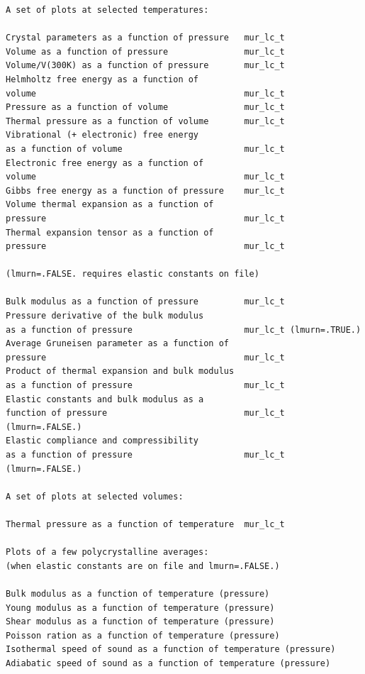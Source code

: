 \documentclass[12pt,a4paper,twoside]{report}
\begin{document}
\begin{footnotesize}
\begin{verbatim}
A set of plots at selected temperatures:

Crystal parameters as a function of pressure   mur_lc_t
Volume as a function of pressure               mur_lc_t
Volume/V(300K) as a function of pressure       mur_lc_t
Helmholtz free energy as a function of         
volume                                         mur_lc_t
Pressure as a function of volume               mur_lc_t
Thermal pressure as a function of volume       mur_lc_t
Vibrational (+ electronic) free energy         
as a function of volume                        mur_lc_t
Electronic free energy as a function of        
volume                                         mur_lc_t
Gibbs free energy as a function of pressure    mur_lc_t
Volume thermal expansion as a function of 
pressure                                       mur_lc_t
Thermal expansion tensor as a function of 
pressure                                       mur_lc_t

(lmurn=.FALSE. requires elastic constants on file)

Bulk modulus as a function of pressure         mur_lc_t
Pressure derivative of the bulk modulus        
as a function of pressure                      mur_lc_t (lmurn=.TRUE.)
Average Gruneisen parameter as a function of   
pressure                                       mur_lc_t
Product of thermal expansion and bulk modulus
as a function of pressure                      mur_lc_t
Elastic constants and bulk modulus as a 
function of pressure                           mur_lc_t (lmurn=.FALSE.)
Elastic compliance and compressibility
as a function of pressure                      mur_lc_t (lmurn=.FALSE.)

A set of plots at selected volumes:

Thermal pressure as a function of temperature  mur_lc_t

Plots of a few polycrystalline averages:
(when elastic constants are on file and lmurn=.FALSE.) 

Bulk modulus as a function of temperature (pressure)
Young modulus as a function of temperature (pressure)
Shear modulus as a function of temperature (pressure)
Poisson ration as a function of temperature (pressure)
Isothermal speed of sound as a function of temperature (pressure)
Adiabatic speed of sound as a function of temperature (pressure)

\end{verbatim}
\end{footnotesize}

\newpage
\end{document}
